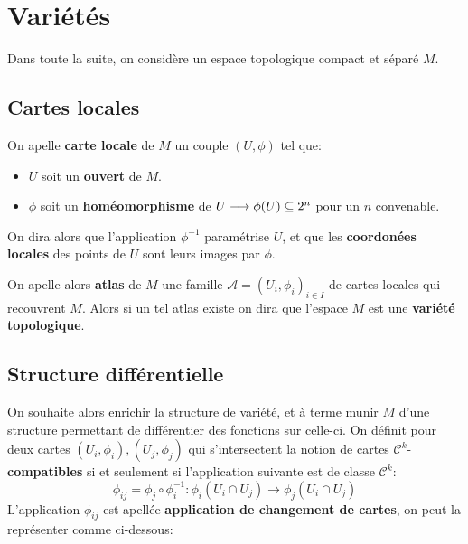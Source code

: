 \chapter{Variétés}
   Dans toute la suite, on considère un espace topologique compact et séparé \( M \).
   \section{Cartes locales}
      On apelle \textbf{carte locale} de \( M \) un couple \( (U, \phi) \) tel que:
      \begin{itemize}
         \item \( U \) soit un \textbf{ouvert} de \( M \).
         \item \( \phi \) soit un \textbf{homéomorphisme} de \( U \longrightarrow \phi(U) \subseteq 2^n \) pour un \( n \) convenable.
      \end{itemize}
      On dira alors que l'application \( \phi^{-1} \) paramétrise \( U \), et que les \textbf{coordonées locales} des points de \( U \) sont leurs images par \( \phi \).\<

      On apelle alors \textbf{atlas} de \( M \) une famille \(\mathcal{A} = (U_i, \phi_i)_{i \in I}\) de cartes locales qui recouvrent \( M \). Alors si un tel atlas existe on dira que l'espace \( M \) est une \textbf{variété topologique}.
   \section{Structure différentielle}
   On souhaite alors enrichir la structure de variété, et à terme munir \( M \) d'une structure permettant de différentier des fonctions sur celle-ci. On définit pour deux cartes \( (U_i, \phi_i), (U_j, \phi_j) \) qui s'intersectent la notion de cartes \( \mathcal{C}^k \)-\textbf{compatibles} si et seulement si l'application suivante est de classe \( \mathcal{C}^k \):
   \[ 
      \phi_{ij} = \phi_j \circ \phi_i^{-1} : \phi_i(U_i \cap U_j) \longrightarrow \phi_j(U_i \cap U_j)
   \]
   L'application \( \phi_{ij} \) est apellée \textbf{application de changement de cartes}, on peut la représenter comme ci-dessous:


